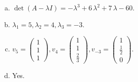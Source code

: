 \begin{questions}
\begin{solution}
\begin{enumerate}[(a)]
\item $\det(A-\lambda I)=-{\lambda}^{3} + 6 \, {\lambda}^{2} + 7 \, {\lambda} - 60$.
\item ${\lambda}_1=5, {\lambda}_2=4, {\lambda}_3=-3$.
\item $v_{5}=\left(\begin{array}{r}
1 \\
1 \\
1
\end{array}\right), v_{4}=\left(\begin{array}{r}
1 \\
1 \\
\frac{2}{3}
\end{array}\right), v_{-3}=\left(\begin{array}{r}
1 \\
\frac{1}{2} \\
0
\end{array}\right)$.
\item Yes.
\end{enumerate}
\end{solution}

\end{questions}

\newpage


\begin{center}
\end{center}


